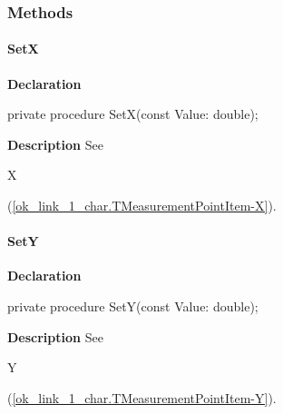 \documentclass{report}
\begin{document}
\subsubsection*{\large{\textbf{Methods}}\normalsize\hspace{1ex}\hfill}
\paragraph*{SetX}\hspace*{\fill}

\begin{list}{}{
\setlength{\itemindent}{0cm}
\setlength{\listparindent}{0cm}
\setlength{\leftmargin}{\evensidemargin}
\addtolength{\leftmargin}{\tmplength}
\settowidth{\labelsep}{X}
\addtolength{\leftmargin}{\labelsep}
\setlength{\labelwidth}{\tmplength}
}
\begin{flushleft}
\item[\textbf{Declaration}\hfill]
\begin{ttfamily}
private procedure SetX(const Value: double);\end{ttfamily}


\end{flushleft}
\par
\item[\textbf{Description}]
See \begin{ttfamily}X\end{ttfamily}(\ref{ok_link_1_char.TMeasurementPointItem-X}).

\end{list}
\paragraph*{SetY}\hspace*{\fill}

\begin{list}{}{
\setlength{\itemindent}{0cm}
\setlength{\listparindent}{0cm}
\setlength{\leftmargin}{\evensidemargin}
\addtolength{\leftmargin}{\tmplength}
\settowidth{\labelsep}{X}
\addtolength{\leftmargin}{\labelsep}
\setlength{\labelwidth}{\tmplength}
}
\begin{flushleft}
\item[\textbf{Declaration}\hfill]
\begin{ttfamily}
private procedure SetY(const Value: double);\end{ttfamily}


\end{flushleft}
\par
\item[\textbf{Description}]
See \begin{ttfamily}Y\end{ttfamily}(\ref{ok_link_1_char.TMeasurementPointItem-Y}).

\end{list}
\end{document}
